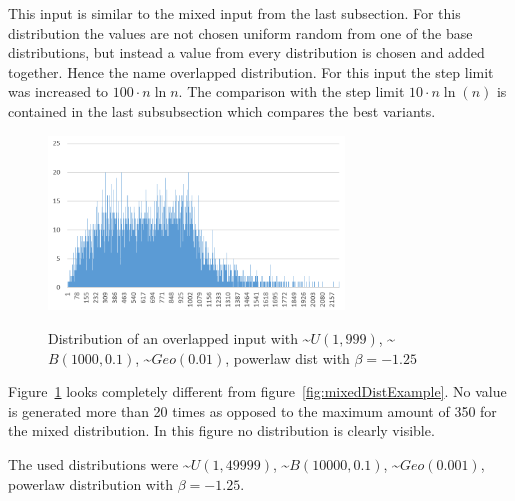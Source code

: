 This input is similar to the mixed input from the last subsection.
For this distribution the values are not chosen uniform random from one of the base distributions, but instead a value from every distribution is chosen and added together.
Hence the name overlapped distribution.
For this input the step limit was increased to $100\cdot n \ln n$.
The comparison with the step limit $10\cdot n \ln(n)$ is contained in the last subsubsection which compares the best variants.

\begin{figure}[h]
      \caption{Distribution of an overlapped input with \textasciitilde$U(1,999)$, \textasciitilde$B(1000,0.1)$, \textasciitilde$Geo(0.01)$, powerlaw dist with $\beta=-1.25$}
      \centering
      \includegraphics[width=0.7\textwidth]{figures/images/numberGenerator/overlapped.png}\label{fig:overlappedDistExample}
\end{figure}

Figure~\ref{fig:overlappedDistExample} looks completely different from figure~\ref{fig:mixedDistExample}.
No value is generated more than 20 times as opposed to the maximum amount of 350 for the mixed distribution.
In this figure no distribution is clearly visible.

The used distributions were \textasciitilde$U(1,49999)$, \textasciitilde$B(10000,0.1)$, \textasciitilde$Geo(0.001)$, powerlaw distribution with $\beta=-1.25$.